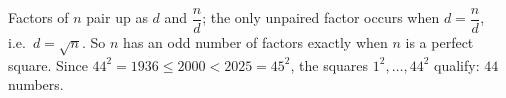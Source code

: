 Factors of $n$ pair up as $d$ and $\dfrac {n}{d}$; the only unpaired factor occurs when $d=\dfrac {n}{d}$, i.e.\ $d=\sqrt n$. So $n$ has an odd number of factors exactly when $n$ is a perfect square. Since $44^2=1936\le2000<2025=45^2$, the squares $1^2,\dots,44^2$ qualify: $\boxed{44}$ numbers.
